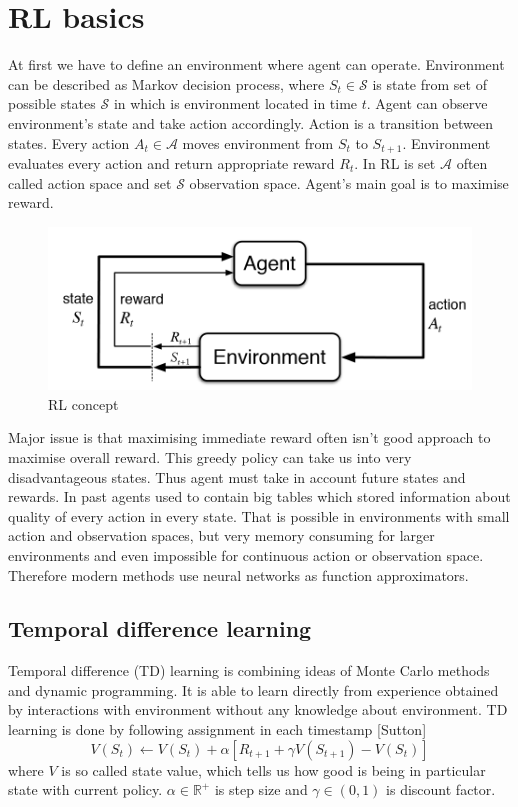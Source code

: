 \chapter{RL basics}
At first we have to define an environment where agent can operate. Environment can be described as Markov decision process, where $S_t \in \mathcal{S}$ is state from set of possible states $\mathcal{S}$ in which is environment located in time $t$. Agent can observe environment's state and take action accordingly. Action is a transition between states. Every action $A_t \in \mathcal{A}$ moves environment from $S_t$ to $S_{t+1}$. Environment evaluates every action and return appropriate reward $R_t$. In RL is set $\mathcal{A}$ often called action space and set $\mathcal{S}$ observation space. Agent's main goal is to maximise reward.

\begin{figure}[!h]
\includegraphics[scale=0.3]{images/RL-concept.png}
\caption{RL concept}
\end{figure}

Major issue is that maximising immediate reward often isn't good approach to maximise overall reward. This greedy policy can take us into very disadvantageous states. Thus agent must take in account future states and rewards. In past agents used to contain big tables which stored information about quality of every action in every state. That is possible in environments with small action and observation spaces, but very memory consuming for larger environments and even impossible for continuous action or observation space. Therefore modern methods use neural networks as function approximators.

\section{Temporal difference learning}
Temporal difference (TD) learning is combining ideas of Monte Carlo methods and dynamic programming. It is able to learn directly from experience obtained by interactions with environment without any knowledge about environment. TD learning is done by following assignment in each timestamp [Sutton]
\begin{equation}
V(S_t) \gets V(S_t) + \alpha [R_{t+1} + \gamma V(S_{t+1}) - V(S_t)]
\end{equation}
where $V$ is so called state value, which tells us how good is being in particular state with current policy. $\alpha \in \mathbb{R}^+$ is step size and $\gamma \in (0, 1)$ is discount factor.

